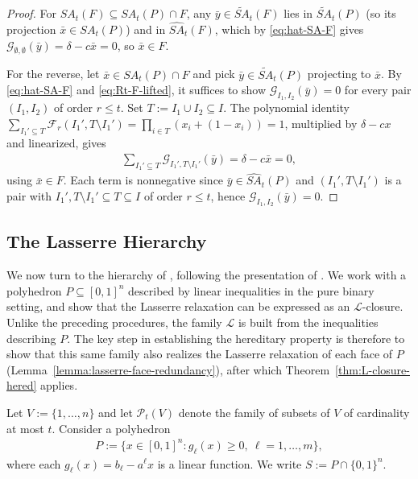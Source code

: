 \documentclass{article}
\newcommand{\F}{\mathcal{F}}
\renewcommand{\P}{\mathcal{P}}
\renewcommand{\L}{\mathcal{L}}
\begin{document}
\begin{proof}
    For $SA_t(F) \subseteq SA_t(P) \cap F$, any $\bar y \in \widetilde{SA}_t(F)$ lies in $\widetilde{SA}_t(P)$ (so its projection $\bar x \in SA_t(P)$) and in $\widehat{SA}_t(F)$, which by \eqref{eq:hat-SA-F} gives $\mathcal{G}_{\emptyset,\emptyset}(\bar y) = \delta - c\bar x = 0$, so $\bar x \in F$.

    For the reverse, let $\bar x \in SA_t(P) \cap F$ and pick $\bar y \in \widetilde{SA}_t(P)$ projecting to $\bar x$. By \eqref{eq:hat-SA-F} and \eqref{eq:Rt-F-lifted}, it suffices to show $\mathcal{G}_{I_1, I_2}(\bar y) = 0$ for every pair $(I_1, I_2)$ of order $r \leq t$. Set $T := I_1 \cup I_2 \subseteq I$. The polynomial identity $\sum_{I_1' \subseteq T} \F_r(I_1', T \setminus I_1') = \prod_{i \in T}(x_i + (1-x_i)) = 1$, multiplied by $\delta - cx$ and linearized, gives
    \begin{align}
        \sum_{I_1' \subseteq T} \mathcal{G}_{I_1', T \setminus I_1'}(\bar y) = \delta - c\bar x = 0,
    \end{align}
    using $\bar x \in F$. Each term is nonnegative since $\bar y \in \widehat{SA}_t(P)$ and $(I_1', T \setminus I_1')$ is a pair with $I_1', T \setminus I_1' \subseteq T \subseteq I$ of order $r \leq t$, hence $\mathcal{G}_{I_1, I_2}(\bar y) = 0$.
\end{proof}

\subsection{The Lasserre Hierarchy} \label{sec:lasserre}

We now turn to the hierarchy of \cite{lasserre2001explicit}, following the presentation of \cite{laurent2003comparison}. We work with a polyhedron $P \subseteq [0,1]^n$ described by linear inequalities in the pure binary setting, and show that the Lasserre relaxation can be expressed as an $\L$-closure. Unlike the preceding procedures, the family $\L$ is built from the inequalities describing $P$. The key step in establishing the hereditary property is therefore to show that this same family also realizes the Lasserre relaxation of each face of $P$ (Lemma~\ref{lemma:lasserre-face-redundancy}), after which Theorem~\ref{thm:L-closure-hered} applies.

Let $V := \{1,\ldots,n\}$ and let $\P_t(V)$ denote the family of subsets of $V$ of cardinality at most $t$. Consider a polyhedron
\begin{align}
    P := \{x \in [0,1]^n : g_\ell(x) \geq 0, \ \ell = 1,\ldots,m\},
\end{align}
where each $g_\ell(x) = b_\ell - {a^\ell} x$ is a linear function. We write $S := P \cap \{0,1\}^n$.
\end{document}
